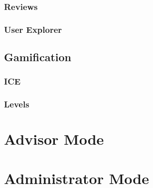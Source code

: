 \subsubsection{Reviews}

\subsubsection{User Explorer}

\subsection{Gamification}
\subsubsection{ICE}

\subsubsection{Levels}

\section{Advisor Mode}

\section{Administrator Mode}